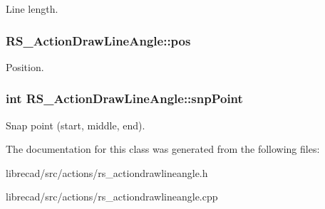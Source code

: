 Line length. \hypertarget{classRS__ActionDrawLineAngle_a46ffce9f47c6772dfaa1230cfb10561c}{
\subsubsection[{pos}]{ R\-S\-\_\-\-Action\-Draw\-Line\-Angle\-::pos\hspace{0.3cm}{\ttfamily [protected]}}}\label{classRS__ActionDrawLineAngle_a46ffce9f47c6772dfaa1230cfb10561c}
Position. \hypertarget{classRS__ActionDrawLineAngle_a5e65648db0c571ea70c8afb58e7ddef5}{
\subsubsection[{snp\-Point}]{\setlength{\rightskip}{0pt plus 5cm}int R\-S\-\_\-\-Action\-Draw\-Line\-Angle\-::snp\-Point\hspace{0.3cm}{\ttfamily [protected]}}}\label{classRS__ActionDrawLineAngle_a5e65648db0c571ea70c8afb58e7ddef5}
Snap point (start, middle, end). 

The documentation for this class was generated from the following files\-:\begin{DoxyCompactItemize}
\item 
librecad/src/actions/rs\-\_\-actiondrawlineangle.\-h\item 
librecad/src/actions/rs\-\_\-actiondrawlineangle.\-cpp\end{DoxyCompactItemize}
